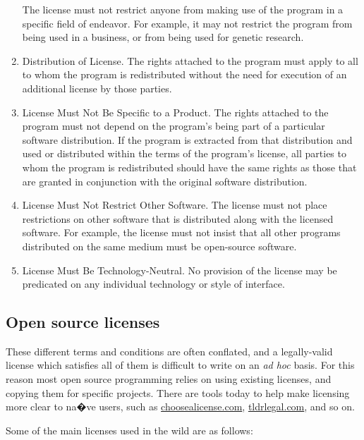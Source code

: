 \begin{enumerate}
  The license must not restrict anyone from making use of the program in a specific field of endeavor. For example, it may not restrict the program from being used in a business, or from being used for genetic research.
\item{Distribution of License}.
  The rights attached to the program must apply to all to whom the program is redistributed without the need for execution of an additional license by those parties.
\item{License Must Not Be Specific to a Product}.
  The rights attached to the program must not depend on the program's being part of a particular software distribution. If the program is extracted from that distribution and used or distributed within the terms of the program's license, all parties to whom the program is redistributed should have the same rights as those that are granted in conjunction with the original software distribution.
\item{License Must Not Restrict Other Software}.
  The license must not place restrictions on other software that is distributed along with the licensed software. For example, the license must not insist that all other programs distributed on the same medium must be open-source software.
\item{License Must Be Technology-Neutral}.
  No provision of the license may be predicated on any individual technology or style of interface.
\end{enumerate}

\subsection{Open source licenses}
\label{subsec:licenses}

These different terms and conditions are often conflated, and a legally-valid license which satisfies all of them is difficult to write on an {\it ad hoc} basis. For this reason most open source programming relies on using existing licenses, and copying them for specific projects. There are tools today to help make licensing more clear to na�ve users, such as \href{https://choosealicense.com}{choosealicense.com}, \href{https://tldrlegal.com}{tldrlegal.com}, and so on.

Some of the main licenses used in the wild are as follows:

